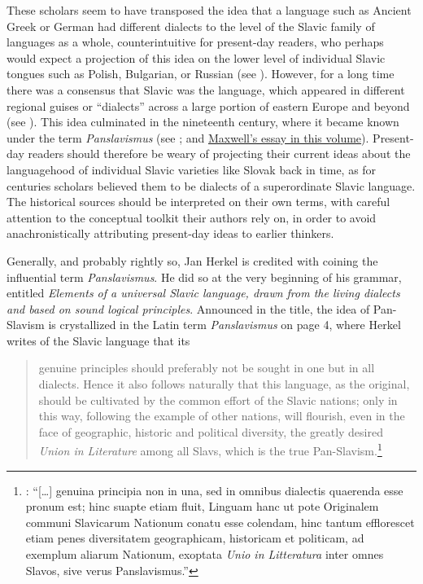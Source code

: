 \noindent These scholars seem to have transposed the idea that a language such as Ancient Greek or German had different dialects to the level of the Slavic family of languages as a whole, counterintuitive for present-day readers, who perhaps would expect a projection of this idea on the lower level of individual Slavic tongues such as Polish, Bulgarian, or Russian (see \cite{maxwell_greece_2022}). However, for a long time there was a consensus that Slavic was the language, which appeared in different regional guises or “dialects” across a large portion of eastern Europe and beyond (see \cite{maxwell_effacing_2018}). This idea culminated in the nineteenth century, where it became known under the term \textit{Panslavismus} (see \cite[9]{kamusella_politics_2021}; and \hyperref[ch:Maxwell]{Maxwell’s essay in this volume}). Present-day readers should therefore be weary of projecting their current ideas about the languagehood of individual Slavic varieties like Slovak back in time, as for centuries scholars believed them to be dialects of a superordinate Slavic language. The historical sources should be interpreted on their own terms, with careful attention to the conceptual toolkit their authors rely on, in order to avoid anachronistically attributing present-day ideas to earlier thinkers.

Generally, and probably rightly so, Jan Herkel is credited with coining the influential term \textit{Panslavismus}. He did so at the very beginning of his grammar, entitled \textit{Elements of a universal Slavic language, drawn from the living dialects and based on sound logical principles}. Announced in the title, the idea of Pan-Slavism is crystallized in the Latin term \textit{Panslavismus} on page 4, where Herkel writes of the Slavic language that its

\begin{quote}
    genuine principles should preferably not be sought in one but in all dialects. Hence it also follows naturally that this language, as the original, should be cultivated by the common effort of the Slavic nations; only in this way, following the example of other nations, will flourish, even in the face of geographic, historic and political diversity, the greatly desired \textit{Union in Literature} among all Slavs, which is the true Pan-Slavism.\footnote{\citet[4]{herkel_elementa_1826}: “[…] genuina principia non in una, sed in omnibus dialectis quaerenda esse pronum est; hinc suapte etiam fluit, Linguam hanc ut pote Originalem communi Slavicarum Nationum conatu esse colendam, hinc tantum efflorescet etiam penes diversitatem geographicam, historicam et politicam, ad exemplum aliarum Nationum, exoptata \textit{Unio in Litteratura} inter omnes Slavos, sive verus Panslavismus.”}
\end{quote}

